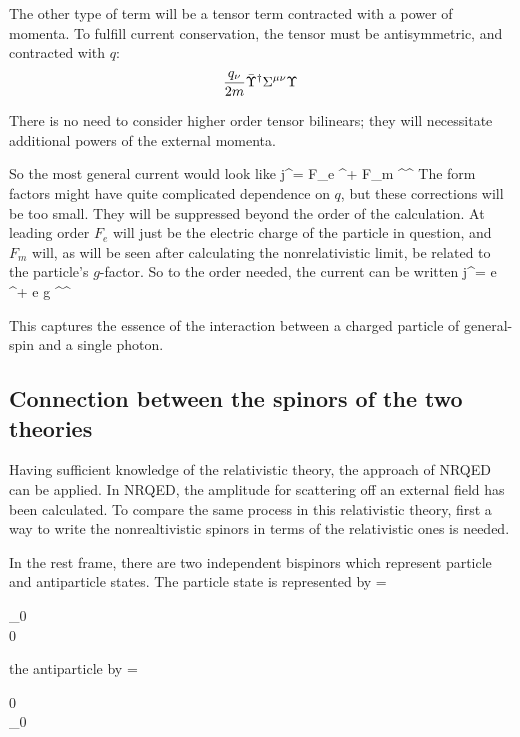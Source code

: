 The other type of term will be a tensor term contracted with a power of momenta.  To fulfill current conservation, the tensor must be antisymmetric, and contracted with $q$:
\[
	\frac{q_\nu}{2m} \bar{\Upsilon}^\dagger \Sigma^{\mu\nu} \Upsilon
\]

There is no need to consider higher order tensor bilinears; they will necessitate additional powers of the external momenta.

So the most general current would look like
\beq \label{eq:khr_current}
	j^\mu = F_e  \Psigbar^\dagger \Psig + F_m 	 \Psigbar^\dagger \TensBi^{\mu\nu} \Psig	
\eeq
The form factors might have quite complicated dependence on $q$, but these corrections will be too small.  They will be suppressed beyond the order of the calculation.  At leading order $F_e$ will just be the electric charge of the particle in question, and $F_m$ will, as will be seen after calculating the nonrelativistic limit, be related to the particle's $g$-factor.  So to the order needed, the current can be written
\beq 
	j^\mu =  e  \Psigbar^\dagger \Psig +   e g  \Psigbar^\dagger \TensBi^{\mu\nu} \Psig
\eeq


This captures the essence of the interaction between a charged particle of general-spin and a single photon.




\subsection{Connection between the spinors of the two theories}
Having sufficient knowledge of the relativistic theory, the approach of NRQED can be applied.  In NRQED, the amplitude for scattering off an external field has been calculated.  To compare the same process in this relativistic theory, first a way to write the nonrealtivistic spinors in terms of the relativistic ones is needed.

In the rest frame, there are two independent bispinors which represent particle and antiparticle states.  The particle state is represented by
\beq
	\Psig = \begin{pmatrix} \xi_0 \\ 0 \end{pmatrix}
\eeq
the antiparticle by
\beq
	\Psig = \begin{pmatrix} 0 \\ \xi_0 \end{pmatrix}
\eeq

